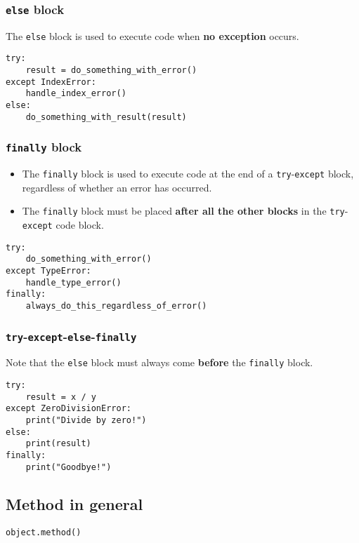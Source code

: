 \documentclass[11pt]{article}
\begin{document}
\subsubsection{\texttt{else} block}
\label{sec:orgec2356e}
The \texttt{else} block is used to execute code when \textbf{no exception} occurs.

\begin{verbatim}
try:
    result = do_something_with_error()
except IndexError:
    handle_index_error()
else:
    do_something_with_result(result)
\end{verbatim}

 \newpage
\subsubsection{\texttt{finally} block}
\label{sec:org7470038}
\begin{itemize}
\item The \texttt{finally} block is used to execute code at the end of a \texttt{try}-\texttt{except} block, regardless of whether an error has occurred.
\item The \texttt{finally} block must be placed \textbf{after all the other blocks} in the \texttt{try}-\texttt{except} code block.
\end{itemize}

\begin{verbatim}
try:
    do_something_with_error()
except TypeError:
    handle_type_error()
finally:
    always_do_this_regardless_of_error()
\end{verbatim}
\subsubsection{\texttt{try}-\texttt{except}-\texttt{else}-\texttt{finally}}
\label{sec:org59806f0}
Note that the \texttt{else} block must always come \textbf{before} the \texttt{finally} block.
\begin{verbatim}
try:
    result = x / y
except ZeroDivisionError:
    print("Divide by zero!")
else:
    print(result)
finally:
    print("Goodbye!")
\end{verbatim}
\subsection{Method in general}
\label{sec:org0e92646}
\begin{verbatim}
object.method()
\end{verbatim}
\end{document}
